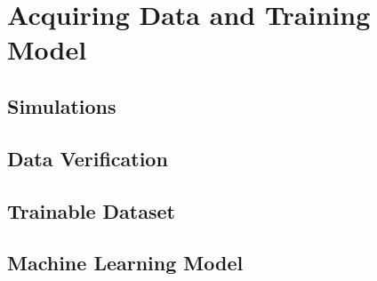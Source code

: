 %
%

\part{Acquiring Data and Training Model}\label{part:simulation_and_data_verification}

\chapter{Simulations}\label{ch:simulation_and_verification:simulations}


\chapter{Data Verification}\label{ch:simulation_and_verification:data_verification}


\chapter{Trainable Dataset}\label{ch:simulation_and_verification:trainable_dataset}


\chapter{Machine Learning Model}\label{ch:simulation_and_verification:ml_model}
